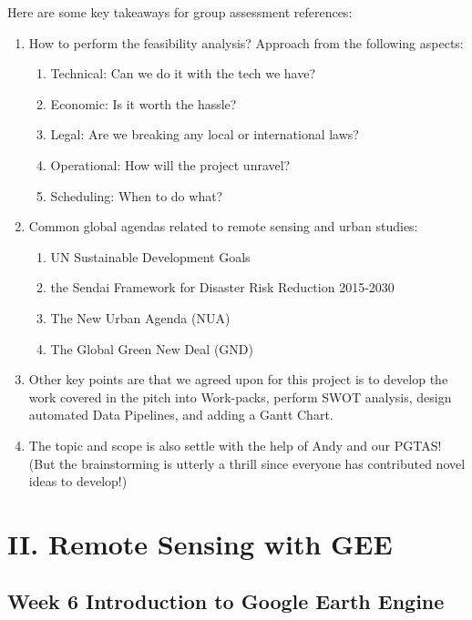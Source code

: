 \documentclass[
  letterpaper,
  DIV=11,
  numbers=noendperiod]{scrreprt}
\providecommand{\tightlist}{%
  \setlength{\itemsep}{0pt}\setlength{\parskip}{0pt}}\usepackage{longtable,booktabs,array}
\begin{document}
Here are some key takeaways for group assessment references:

\begin{enumerate}
\def\labelenumi{\arabic{enumi}.}
\tightlist
\item
  How to perform the feasibility analysis? Approach from the following
  aspects:

  \begin{enumerate}
  \def\labelenumii{\roman{enumii}.}
  \tightlist
  \item
    Technical: Can we do it with the tech we have?
  \item
    Economic: Is it worth the hassle?
  \item
    Legal: Are we breaking any local or international laws?
  \item
    Operational: How will the project unravel?
  \item
    Scheduling: When to do what?
  \end{enumerate}
\item
  Common global agendas related to remote sensing and urban studies:

  \begin{enumerate}
  \def\labelenumii{\roman{enumii}.}
  \tightlist
  \item
    UN Sustainable Development Goals
  \item
    the Sendai Framework for Disaster Risk Reduction 2015-2030
  \item
    The New Urban Agenda (NUA)
  \item
    The Global Green New Deal (GND)
  \end{enumerate}
\item
  Other key points are that we agreed upon for this project is to
  develop the work covered in the pitch into Work-packs, perform SWOT
  analysis, design automated Data Pipelines, and adding a Gantt Chart.
\item
  The topic and scope is also settle with the help of Andy and our
  PGTAS! (But the brainstorming is utterly a thrill since everyone has
  contributed novel ideas to develop!)
\end{enumerate}

\part{II. Remote Sensing with GEE}

\hypertarget{week-6-introduction-to-google-earth-engine}{%
\chapter*{Week 6 Introduction to Google Earth
Engine}\label{week-6-introduction-to-google-earth-engine}}
\end{document}

